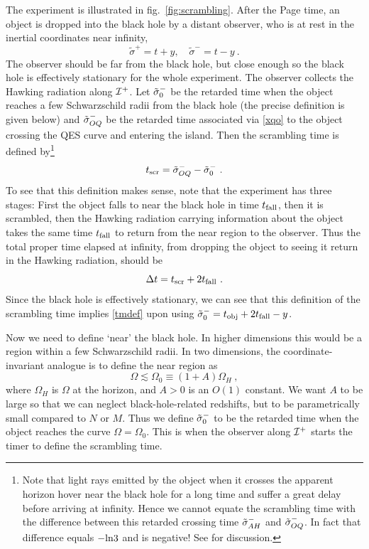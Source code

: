 \documentclass[11pt,oneside,letterpaper]{article}
\newcommand{\be}{\begin{equation}}
\newcommand{\ee}{\end{equation}}
\def\be{\begin{eqnarray}}
\def\ee{\end{eqnarray}}
\def\be{\begin{equation}}
\def\ee{\end{equation}}
\def\m{{M}}
\def\log{{\rm ln}}
\numberwithin{equation}{section}
\def \be {\begin{equation}}
\def \ee {\end{equation}}
\begin{document}
The experiment is illustrated in fig.~\ref{fig:scrambling}. After the Page time, an object is dropped into the black hole by a distant observer, who is at rest in the inertial coordinates near infinity,
\be
\tilde{\sigma}^+ = t + y , \quad \tilde{\sigma}^- = t - y \ .
\ee
The observer should be far from the black hole, but close enough so the black hole is effectively stationary for the whole experiment.
The observer collects the Hawking radiation along ${\cal I}^+$. Let $\tilde{\sigma}^-_0$ be the retarded time when the object reaches a few Schwarzschild radii from the black hole (the precise definition is given below) and $\tilde{\sigma}_{OQ}^-$ be the retarded time associated via 
\eqref{xqo} to the object crossing the QES curve and entering  the  island. Then the scrambling time is defined by\footnote{Note that light rays emitted by the object when it crosses the apparent horizon hover near the black hole for a long time and suffer a great delay before arriving at infinity. Hence we cannot equate the scrambling time with the difference between this retarded crossing time $\tilde{\sigma}_{AH}^-$ and $\tilde{\sigma}_{OQ}^-$. In fact that difference equals $-\log 3$ and is negative! See \cite{Penington:2019npb,Almheiri:2019psf,Almheiri:2019hni,Almheiri:2019yqk} for discussion.}
\be\label{tmdef}
t_{\rm scr} = \tilde{\sigma}^-_{OQ} - \tsigma^-_0 \ .
\ee
To see that this definition makes sense, note that the experiment has three stages: First the object falls to near the black hole in time $t_{\rm fall}$, then it is scrambled, then the Hawking radiation carrying information about the object takes the same time $t_{\rm fall}$ to return from the near region to the observer. Thus the total proper time elapsed at infinity, from dropping the object to seeing it return in the Hawking radiation, should be 
\be
\Delta t = t_{\rm scr} + 2 t_{\rm fall} \ .
\ee
Since the black hole is effectively stationary, we can see that this definition of the scrambling time implies \eqref{tmdef} upon using $\tilde{\sigma}^-_0 = t_{\rm obj}+2t_{\rm fall} - y$. 

Now we need to define `near' the black hole.   In higher dimensions this would be a region within a few Schwarzschild radii. In two dimensions, the coordinate-invariant analogue is to define the near region as
\be
\Omega \lesssim \Omega_0 \equiv (1+A) \Omega_H \ ,
\ee
where $\Omega_H$ is $\Omega$ at the horizon, and $A > 0$ is an $O(1)$ constant. We want $A$ to be large so that we can neglect black-hole-related redshifts, but to be parametrically small compared to $N$ or $\m$. Thus we define $\tilde{\sigma}^-_0$ to be the retarded time when the object reaches the curve $\Omega = \Omega_0$. This is when the observer along ${\cal I}^+$ starts the timer to define the scrambling time.
\end{document}
